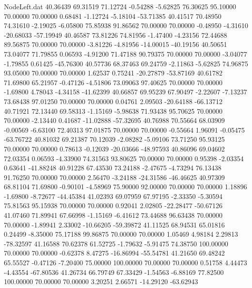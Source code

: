 \begin{filecontents}{NodeLeft.dat}
  40.36439   69.31519   71.12724    -0.54288   -5.62825   76.30625   95.10000   70.00000   70.00000    0.68481   -1.12724   -5.18104  -53.71385
  40.41517   70.48950   74.31610    -2.19025   -6.05800   75.85938   91.86562   70.00000   70.00000   -0.48950   -4.31610  -20.68033  -57.19949
  40.46587   73.81226   74.81956    -1.47400   -4.23156   72.44688   89.56875   70.00000   70.00000   -3.81226   -4.81956  -14.00015  -40.19156
  40.50651   73.04077   71.79855     0.06593   -4.91200   71.47188   90.79375   70.00000   70.00000   -3.04077   -1.79855    0.61425  -45.76300
  40.57736   68.37463   69.24759    -2.11863   -5.62825   74.96875   93.05000   70.00000   70.00000    1.62537    0.75241  -20.27879  -53.87169
  40.61782   71.69800   65.21957    -0.47126   -4.51806   73.09063   97.40625   70.00000   70.00000   -1.69800    4.78043   -4.34158  -41.62399
  40.66857   69.95239   67.90497    -2.22607   -7.13237   73.68438   97.01250   70.00000   70.00000    0.04761    2.09503  -20.64188  -66.13712
  40.71921   72.13440   69.58313    -1.15169   -5.98638   71.93438   95.70625   70.00000   70.00000   -2.13440    0.41687  -11.02888  -57.32695
  40.76988   70.55664   68.03909    -0.00569   -6.63100   72.40313   97.01875   70.00000   70.00000   -0.55664    1.96091   -0.05475  -63.76722
  40.81032   69.21387   70.12039    -2.08282   -5.09106   73.71250   95.93125   70.00000   70.00000    0.78613   -0.12039  -20.03666  -48.97593
  40.86096   69.04602   72.03354     0.06593   -4.33900   74.31563   93.80625   70.00000   70.00000    0.95398   -2.03354    0.63641  -41.88248
  40.91228   67.43530   73.24188    -2.47675   -4.73294   76.13438   91.76250   70.00000   70.00000    2.56470   -3.24188  -24.31586  -46.46625
  40.97309   68.81104   71.69800    -0.90101   -4.58969   75.90000   92.00000   70.00000   70.00000    1.18896   -1.69800   -8.72677  -44.45384
  41.02393   69.07959   67.97195    -2.33350   -5.30594   75.81563   95.15938   70.00000   70.00000    0.92041    2.02805  -22.28477  -50.67126
  41.07460   71.89941   67.66998    -1.15169   -6.41612   73.44688   96.63438   70.00000   70.00000   -1.89941    2.33002  -10.66205  -59.39872
  41.11525   68.94531   65.01816     0.24499   -8.35000   75.17188   99.86875   70.00000   70.00000    1.05469    4.98184    2.29813  -78.32597
  41.16588   70.62378   61.52725    -1.79632   -5.91475   74.38750  100.00000   70.00000   70.00000   -0.62378    8.47275  -16.86994  -55.54781
  41.21650   69.48242   65.55527    -0.47126   -7.20400   75.00000  100.00000   70.00000   70.00000    0.51758    4.44473   -4.43554  -67.80536
  41.26734   66.79749   67.33429    -1.54563   -6.88169   77.82500  100.00000   70.00000   70.00000    3.20251    2.66571  -14.29120  -63.62943

\end{filecontents}

